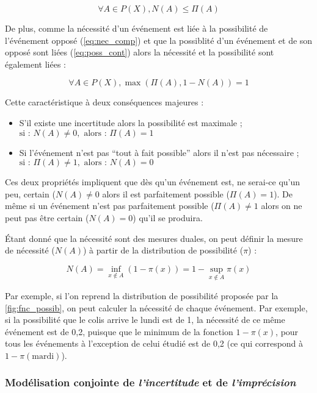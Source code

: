 \begin{equation}
  \forall A \in P(X), N(A) ≤ \Pi(A)
\end{equation}

De plus, comme la nécessité d'un événement est liée à la possibilité
de l'événement opposé (\autoref{eq:nec_comp}) et que la possiblité
d'un événement et de son opposé sont liées (\autoref{eq:poss_cont})
alors la nécessité et la possibilité sont également liées :

\begin{equation}
  \forall A \in P(X), \max(\Pi(A), 1-N(A)) = 1
\end{equation}

Cette caractéristique à deux conséquences majeures :

\begin{itemize}
\item S'il existe une incertitude alors la possibilité est maximale ;
  \(\text{si : } N(A) ≠ 0, \text{ alors : } Π(A)=1\)
\item Si l'événement n'est pas \enquote{tout à fait possible} alors il
  n'est pas nécessaire ;
  \(\text{si : } Π(A) ≠ 1, \text{ alors : } N(A)=0\)
\end{itemize}

Ces deux propriétés impliquent que dès qu'un événement est, ne
serai-ce qu'un peu, certain (\(N(A) ≠ 0\) alors il est parfaitement
possible (\(Π(A)=1\)). De même si un événement n'est pas parfaitement
possible (\(Π(A) ≠ 1\) alors on ne peut pas être certain
(\(N(A) = 0\)) qu'il se produira.

Étant donné que la nécessité sont des mesures duales, on peut définir
la mesure de nécessité (\(N(A)\)) à partir de la distribution de
possibilité (\(π\)) :

\begin{equation}
  N(A) = \inf_{x ∉ A}(1-π(x)) = 1 - \sup_{x ∉ A}π(x)
\end{equation}

Par exemple, si l'on reprend la distribution de possibilité proposée
par la \autoref{fig:fnc_possib}, on peut calculer la nécessité de
chaque événement. Par exemple, si la possibilité que le colis arrive
le lundi est de 1, la nécessité de ce même événement est de 0,2,
puisque que le minimum de la fonction \(1-π(x)\), pour tous les
événements à l'exception de celui étudié est de 0,2 (ce qui correspond
à \(1-π(\text{mardi})\)).



\subsubsection{Modélisation conjointe de \emph{l'incertitude} et de
\emph{l'imprécision}}


